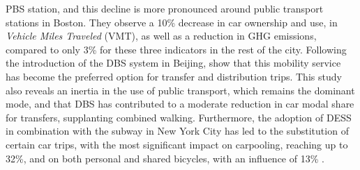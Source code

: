 \begin{refsegment}
\acrshort{PBS} station, and this decline is more pronounced around public transport stations in Boston. They observe a 10\% decrease in car ownership and use, in \textsl{Vehicle Miles Traveled} (VMT), as well as a reduction in \acrfull{GHG} emissions, compared to only 3\% for these three indicators in the rest of the city. Following the introduction of the \acrshort{DBS} system in Beijing, \textcolor{blue}{\textcite[10]{fan_how_2019}} show that this mobility service has become the preferred option for transfer and distribution trips. This study also reveals an inertia in the use of public transport, which remains the dominant mode, and that \acrshort{DBS} has contributed to a moderate reduction in car modal share for transfers, supplanting combined walking. Furthermore, the adoption of \acrshort{DESS} in combination with the subway in New York City has led to the substitution of certain car trips, with the most significant impact on carpooling, reaching up to 32\%, and on both personal and shared bicycles, with an influence of 13\% \textcolor{blue}{\autocite[25]{lee_forecasting_2021}}.%


\end{refsegment}
